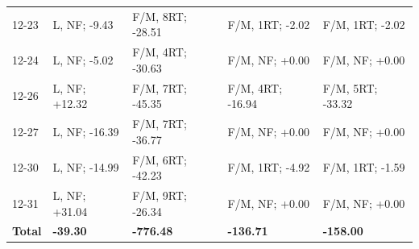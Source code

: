 \begin{table}[H]
\begin{tabular*}{\textwidth}{@{\extracolsep{\fill}} lllll}
12-23 & L, NF; -9.43 & F/M, 8RT; -28.51 & F/M, 1RT; -2.02 & F/M, 1RT; -2.02 \\
12-24 & L, NF; -5.02 & F/M, 4RT; -30.63 & F/M, NF; +0.00 & F/M, NF; +0.00 \\
12-26 & L, NF; +12.32 & F/M, 7RT; -45.35 & F/M, 4RT; -16.94 & F/M, 5RT; -33.32 \\
12-27 & L, NF; -16.39 & F/M, 7RT; -36.77 & F/M, NF; +0.00 & F/M, NF; +0.00 \\
12-30 & L, NF; -14.99 & F/M, 6RT; -42.23 & F/M, 1RT; -4.92 & F/M, 1RT; -1.59 \\
12-31 & L, NF; +31.04 & F/M, 9RT; -26.34 & F/M, NF; +0.00 & F/M, NF; +0.00 \\
\textbf{Total} & \textbf{-39.30} & \textbf{-776.48} & \textbf{-136.71} & \textbf{-158.00} \\


\end{tabular*}
\end{table}

